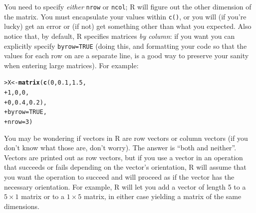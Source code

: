 \documentclass[11pt]{article}\usepackage[]{graphicx}\usepackage[]{color}
\makeatletter
\newcommand{\hlnum}[1]{\textcolor[rgb]{0.686,0.059,0.569}{#1}}%
\newcommand{\hlstd}[1]{\textcolor[rgb]{0.345,0.345,0.345}{#1}}%
\newcommand{\hlkwb}[1]{\textcolor[rgb]{0.69,0.353,0.396}{#1}}%
\newcommand{\hlkwc}[1]{\textcolor[rgb]{0.333,0.667,0.333}{#1}}%
\newcommand{\hlkwd}[1]{\textcolor[rgb]{0.737,0.353,0.396}{\textbf{#1}}}%
\newenvironment{kframe}{%
 \def\at@end@of@kframe{}%
 \ifinner\ifhmode%
  \def\at@end@of@kframe{\end{minipage}}%
  \begin{minipage}{\columnwidth}%
 \fi\fi%
 \def\FrameCommand##1{\hskip\@totalleftmargin \hskip-\fboxsep
 \colorbox{shadecolor}{##1}\hskip-\fboxsep
     \hskip-\linewidth \hskip-\@totalleftmargin \hskip\columnwidth}%
 \MakeFramed {\advance\hsize-\width
   \@totalleftmargin\z@ \linewidth\hsize
   \@setminipage}}%
 {\par\unskip\endMakeFramed%
 \at@end@of@kframe}
\newenvironment{knitrout}{}{} %
\newcommand{\code}[1]{{\tt #1}}
\numberwithin{exercise}{section}
\makeatother
\begin{document}
You need to specify \emph{either} \code{nrow} or \code{ncol};
R will figure out the other dimension of the matrix.  You must
encapsulate your values within \code{c()}, or you will (if you're
lucky) get an error or (if not) get something other than what you expected.
Also notice that, by default, R specifies matrices \emph{by column}: if you
want you can explicitly specify \code{byrow=TRUE} (doing this,
and formatting your code so that the values for each row on are
a separate line, is a good way to preserve your sanity when
entering large matrices). For example:
\begin{knitrout}
\color{fgcolor}\begin{kframe}
\begin{alltt}
\hlstd{> }\hlstd{X} \hlkwb{<-} \hlkwd{matrix}\hlstd{(}\hlkwd{c}\hlstd{(}\hlnum{0}\hlstd{,} \hlnum{0.1}\hlstd{,} \hlnum{1.5}\hlstd{,}
\hlstd{+ }              \hlnum{1}\hlstd{,}   \hlnum{0}\hlstd{,} \hlnum{0}\hlstd{,}
\hlstd{+ }              \hlnum{0}\hlstd{,}   \hlnum{0.4}\hlstd{,} \hlnum{0.2}\hlstd{),}
\hlstd{+ }            \hlkwc{byrow} \hlstd{=} \hlnum{TRUE}\hlstd{,}
\hlstd{+ }            \hlkwc{nrow} \hlstd{=} \hlnum{3}\hlstd{)}
\end{alltt}
\end{kframe}
\end{knitrout}

You may be wondering if vectors in R 
are row vectors or column vectors (if you don't know what those are,
don't worry). The answer is ``both and neither''.
Vectors are printed out as row vectors, but if you use a vector in 
an operation that succeeds or fails depending on the vector's orientation, 
R will assume that you want the operation to succeed and will proceed as 
if the vector has the necessary orientation. For example, R will let
you add a vector of length 5 to a $5 \times 1$ matrix or to a 
$1 \times 5$ matrix, in either case yielding a matrix of the 
same dimensions.
\end{document}
